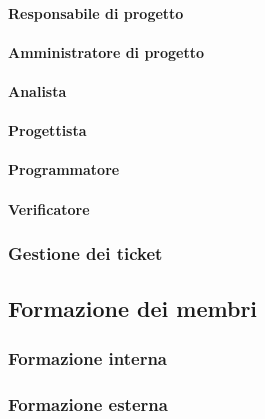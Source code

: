 \paragraph{Responsabile di progetto}
\paragraph{Amministratore di progetto}
\paragraph{Analista}
\paragraph{Progettista}
\paragraph{Programmatore}
\paragraph{Verificatore}
\subsubsection{Gestione dei ticket}

\subsection{Formazione dei membri}
\subsubsection{Formazione interna}
\subsubsection{Formazione esterna}